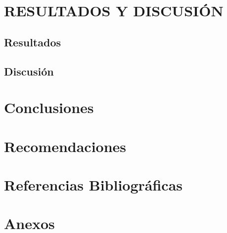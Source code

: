 \documentclass[12pt,a4paper,openany,oneside]{book}
\begin{document}
    \chapter{RESULTADOS Y DISCUSIÓN}
        \section{Resultados}
        \section{Discusión}

    \backmatter
    \chapter*{Conclusiones}

    \chapter*{Recomendaciones}

    \chapter*{Referencias Bibliográficas}

    \chapter*{Anexos}
    
    
\end{document}
